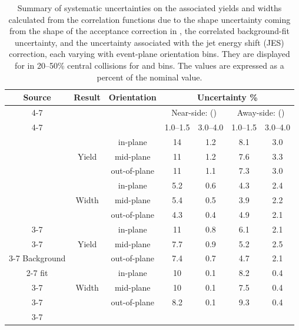 \begin{table}[!htbp]
	\caption[Orientation-dependent systematic uncertainties for 15--20~GeV/\(c\) jets]{Summary of systematic uncertainties on the associated yields and widths calculated from the correlation functions due to the shape uncertainty coming from the shape of the acceptance correction in \deta, the correlated background-fit uncertainty, and the uncertainty associated with the jet energy shift (JES) correction, each varying with event-plane orientation bins.  They are displayed for  in 20--50\% central \AuAu collisions for  and  bins.  The values are expressed as a percent of the nominal value.}
	\label{Tab:SystematicSummaryEPdep}
	\centering
	\small
	\setlength{\tabcolsep}{4pt}
	\begin{tabular}{c | c | c | c | c | c | c}\hline
		\multirow{3}{*}{Source} & \multirow{3}{*}{Result} & \multirow{3}{*}{Orientation} & \multicolumn{4}{c}{Uncertainty \%} \\ \cline{4-7}
		&   &      & \multicolumn{2}{c|}{Near-side: \Pt{assoc} (\GeVc)} & \multicolumn{2}{c}{Away-side: \Pt{assoc} (\GeVc)} \Bstrut \\ \cline{4-7}     
		&   &      & 1.0--1.5 & 3.0--4.0 & 1.0--1.5 & 3.0--4.0 \\ \hline       
		
		\multirow{6}{*}{} & \multirow{3}{*}{Yield} & in-plane & 14 & 1.2 & 8.1 & 3.0  \\ \cline{3-7}
		& & mid-plane & 11 & 1.2 & 7.6 & 3.3 \\ \cline{3-7}
		Acceptance & & out-of-plane & 11 & 1.1 & 7.3 & 3.0 \\ \cline{2-7}
		shape & \multirow{3}{*}{Width} & in-plane & 5.2 & 0.6 & 4.3 & 2.4 \\ \cline{3-7}
		& & mid-plane    & 5.4 & 0.5 & 3.9 & 2.2 \\ \cline{3-7}
		& & out-of-plane & 4.3 & 0.4 & 4.9 & 2.1 \\ \cline{3-7}
		\hline
		
		\multirow{6}{*}{} & \multirow{3}{*}{Yield} & in-plane & 11 & 0.8 & 6.1 & 2.1 \\ \cline{3-7}
		& & mid-plane & 7.7 & 0.9 & 5.2 & 2.5 \\ \cline{3-7}
		Background & & out-of-plane & 7.4 & 0.7 & 4.7 & 2.1  \\ \cline{2-7}
		fit & \multirow{3}{*}{Width} & in-plane & 10 & 0.1 & 8.2 & 0.4 \\ \cline{3-7}
		& & mid-plane    & 10 & 0.1 & 7.5 & 0.4 \\ \cline{3-7}
		& & out-of-plane & 8.2 & 0.1 & 9.3 & 0.4 \\ \cline{3-7}
		\hline
		

\end{tabular}
\end{table}
